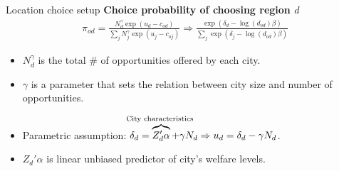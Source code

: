 \documentclass[aspectratio=169]{beamer}
\begin{document}
\begin{frame}{Location choice setup}
	\textbf{Choice probability of choosing region $d$}	
	\begin{align}
		\pi_{od} = \frac{N_d^\gamma \exp(u_d - c_{od})}{\sum_j N_j^\gamma \exp(u_j - c_{oj})}\Rightarrow \frac{\exp(\delta_d - \log(d_{od})\beta)}{\sum_j \exp(\delta_j - \log\left(d_{od}  \right)\beta )}
	\end{align}

	\begin{itemize}
		\item $N_d^\gamma$ is the total \#  of opportunities offered by each city.
		\item $\gamma$ is a parameter that sets the relation between city size and number of opportunities.
		\item Parametric assumption: $\delta_d = \overbrace{Z_d' \alpha}^{\text{\hidewidth City characteristics \hidewidth}} + \gamma N_d \Rightarrow u_d = \delta_d - \gamma N_d $. 
		\item $Z_d' \alpha$ is linear unbiased predictor of city's welfare levels.
	\end{itemize}
\end{frame}
\end{document}
